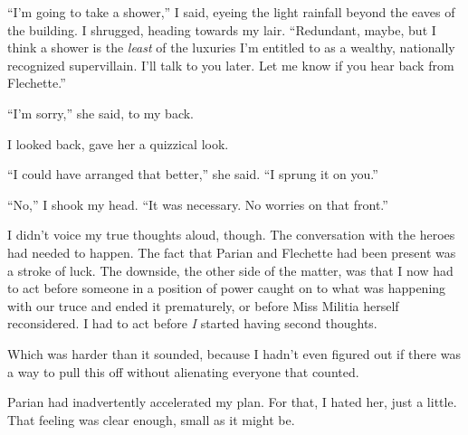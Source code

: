 ``I'm going to take a shower,'' I said, eyeing the light rainfall beyond the eaves of the building.  I shrugged, heading towards my lair.  ``Redundant, maybe, but I think a shower is the \emph{least} of the luxuries I'm entitled to as a wealthy, nationally recognized supervillain.  I'll talk to you later.  Let me know if you hear back from Flechette.''



``I'm sorry,'' she said, to my back.



I looked back, gave her a quizzical look.



``I could have arranged that better,'' she said.  ``I sprung it on you.''



``No,'' I shook my head.  ``It was necessary.  No worries on that front.''



I didn't voice my true thoughts aloud, though.  The conversation with the heroes had needed to happen.  The fact that Parian and Flechette had been present was a stroke of luck.  The downside, the other side of the matter, was that I now had to act before someone in a position of power caught on to what was happening with our truce and ended it prematurely, or before Miss Militia herself reconsidered.  I had to act before \emph{I} started having second thoughts.



Which was harder than it sounded, because I hadn't even figured out if there was a way to pull this off without alienating everyone that counted.



Parian had inadvertently accelerated my plan. For that, I hated her, just a little.  That feeling was clear enough, small as it might be.





